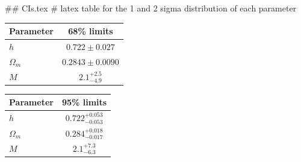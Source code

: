 ## CIs.tex
# latex table for the 1 and 2 sigma distribution of each parameter

\begin{tabular} { l  c}
 Parameter &  68\% limits\\
\hline
{\boldmath$h              $} & $0.722\pm 0.027            $\\
{\boldmath$\Omega_m       $} & $0.2843\pm 0.0090          $\\
{\boldmath$M              $} & $2.1^{+2.5}_{-4.9}         $\\
\hline
\end{tabular}

\begin{tabular} { l  c}
 Parameter &  95\% limits\\
\hline
{\boldmath$h              $} & $0.722^{+0.053}_{-0.053}   $\\
{\boldmath$\Omega_m       $} & $0.284^{+0.018}_{-0.017}   $\\
{\boldmath$M              $} & $2.1^{+7.3}_{-6.3}         $\\
\hline
\end{tabular}
